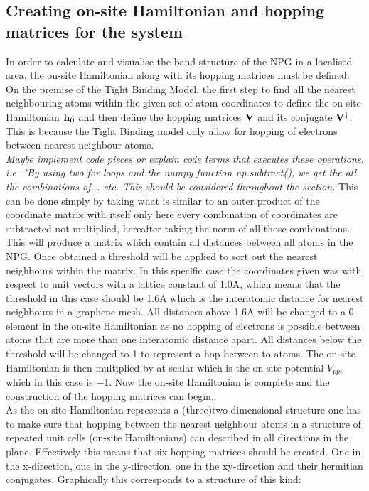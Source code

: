 \subsection{Creating on-site Hamiltonian and hopping matrices for the system}
In order to calculate and visualise the band structure of the NPG in a localised area, the on-site Hamiltonian along with its hopping matrices must be defined. On the premise of the Tight Binding Model, the first step to find all the nearest neighbouring atoms within the given set of atom coordinates to define the on-site Hamiltonian \(\bf{h}_0\) and then define the hopping matrices \(\bf{V}\) and its conjugate \(\bf{V}^{\dagger}\). This is because the Tight Binding model only allow for hopping of electrons between nearest neighbour atoms.\\ \textit{Maybe implement code pieces or explain code terms that executes these operations. i.e. "By using two for loops and the numpy function np.subtract(), we get the all the combinations of... etc. This should be considered throughout the section.} This can be done simply by taking what is similar to an outer product of the coordinate matrix with itself only here every combination of coordinates are subtracted not multiplied, hereafter taking the norm of all those combinations. This will produce a matrix which contain all distances between all atoms in the NPG. Once obtained a threshold will be applied to sort out the nearest neighbours within the matrix. In this specific case the coordinates given was with respect to unit vectors with a lattice constant of 1.0A, which means that the threshold in this case should be 1.6A which is the interatomic distance for nearest neighbours in a graphene mesh. All distances above 1.6A will be changed to a 0-element in the on-site Hamiltonian as no hopping of electrons is possible between atoms that are more than one interatomic distance apart. All distances below the threshold will be changed to 1 to represent a hop between to atoms. The on-site Hamiltonian is then multiplied by at scalar which is the on-site potential \(V_{ppi}\) which in this case is \(-1\). Now the on-site Hamiltonian is complete and the construction of the hopping matrices can begin. \\
As the on-site Hamiltonian represents a (three)two-dimensional structure one has to make sure that hopping between the nearest neighbour atoms in a structure of repeated unit cells (on-site Hamiltonians) can described in all directions in the plane. Effectively this means that six hopping matrices should be created. One in the x-direction, one in the y-direction, one in the xy-direction and their hermitian conjugates. Graphically this corresponds to a structure of this kind:
